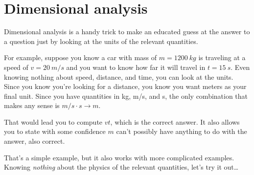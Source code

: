 \documentclass{handout}
\begin{document}
\section{Dimensional analysis}

Dimensional analysis is a handy trick to make an educated guess at the answer to a question just by looking at the units of the relevant quantities.

For example, suppose you know a car with mass of $m = \SI{1200}{kg}$ is traveling at a speed of $v = \SI{20}{m/s}$ and you want to know how far it will travel in $t = \SI{15}{s}$. Even knowing nothing about speed, distance, and time, you can look at the units. Since you know you're looking for a distance, you know you want meters as your final unit. Since you have quantities in kg, m/s, and s, the only combination that makes any sense is $\si{m/s} \cdot \si{s} \rightarrow \si{m}$.

That would lead you to compute $vt$, which is the correct answer. It also allows you to state with some confidence $m$ can't possibly have anything to do with the answer, also correct.

That's a simple example, but it also works with more complicated examples. Knowing \emph{nothing} about the physics of the relevant quantities, let's try it out\ldots
\end{document}
